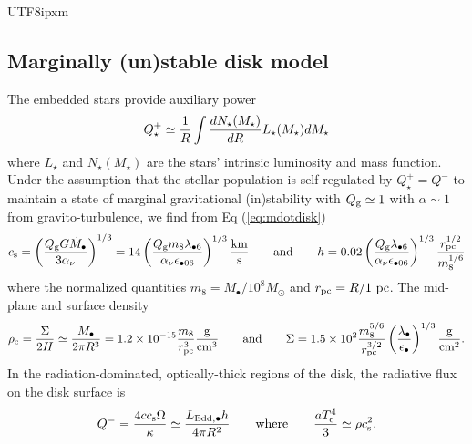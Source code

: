 \documentclass[linenumbers,trackchanges]{aastex701}
\begin{document}
\begin{CJK*}{UTF8}{ipxm}
\subsection{Marginally (un)stable disk model}
The embedded stars provide auxiliary power 
\begin{equation}
    Q^+ _\star \simeq {1 \over R} \int {d N_\star (M_\star) \over d R} L_\star (M_\star) dM_\star 
    \label{eq:qplusstar}
\end{equation}
where $L_\star$ and $N_\star (M_\star)$ are the stars'
intrinsic luminosity and mass function.  Under the 
assumption that the stellar population is self regulated
by $Q^+ _\star = Q^-$ to maintain a state of marginal
gravitational (in)stability \citep{goodman2003, jiang2011, 
chen2023} with $Q_{\rm g} \simeq 1$ with $\alpha \sim 1$ from
gravito-turbulence\citep{lin1987, rafikov2009}, we find 
from Eq (\ref{eq:mdotdisk}) 
\begin{equation}
    c_{\rm s}= \left({Q_{\rm g} G {\dot M}_\bullet \over 3 \alpha_\nu} \right)^{1/3} =
    14  \left( {Q_{\rm g} m_8 \lambda_{\bullet 6} \over \alpha_\nu \epsilon_{\bullet 06}} \right)^{1/3} 
    {\rm km \over s} \ \ \ \ \ \ {\rm and} \ \ \ \ \ \ h=0.02 
    \left( {Q_{\rm g}  \lambda_{\bullet 6} \over \alpha_\nu \epsilon_{\bullet 06}} \right)^{1/3} 
    {r_{\rm pc}^{1/2} \over m_8 ^{1/6}}
    \label{eq:cs}
\end{equation}
where the normalized quantities $m_8=M_\bullet/10^8 M_\odot$
and $r_{\rm pc} = R/ {1 \ \rm pc}$. The mid-plane and surface density
\begin{equation}
\rho_{\rm c} = {\Sigma \over 2 H} \simeq {M_\bullet \over 2 
\pi R^3} = 1.2 \times 10^{-15} {m_8 \over r_{\rm pc}^3} 
{\rm g \over cm^3}
   \ \ \ \ \ \ {\rm and} \ \ \ \ \ \  
\Sigma 
= 1.5 \times 10^2 {m_8^{5/6} \over r_{\rm pc}^{3/2}}
\left({\lambda_\bullet \over \epsilon_\bullet} \right)^{1/3}
{\rm g \over cm^2}.
\label{eq:rhoc}
\end{equation}
In the radiation-dominated, optically-thick regions of the disk, the radiative flux on 
the disk surface is
\begin{equation}
    Q^- = {4 c c_{\rm s} \Omega \over \kappa} 
    \simeq \dfrac{L_{\rm Edd, \bullet} h}{4\pi R^2}
    \ \ \ \ \ \ {\rm where} \ \ \ \ \ \ {a T_{\rm c}^4   
    \over 3} \simeq \rho c_{\rm s} ^2.
    \label{eq:qminus}
\end{equation}


\end{CJK*}
\end{document}
